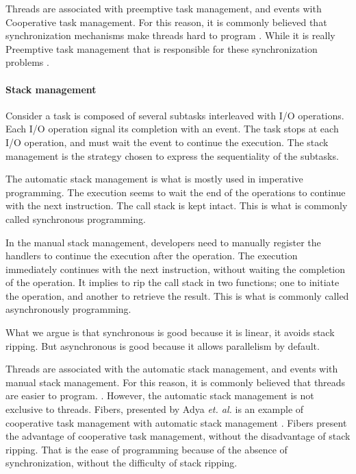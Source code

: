 Threads are associated with preemptive task management, and events with Cooperative task management.
For this reason, it is commonly believed that synchronization mechanisms make threads hard to program \cite{Ousterhout1996}.
While it is really Preemptive task management that is responsible for these synchronization problems \cite{Adya2002}.

\paragraph{Stack management}

Consider a task is composed of several subtasks interleaved with I/O operations.
Each I/O operation signal its completion with an event.
The task stops at each I/O operation, and must wait the event to continue the execution.
The stack management is the strategy chosen to express the sequentiality of the subtasks.

The automatic stack management is what is mostly used in imperative programming.
The execution seems to wait the end of the operations to continue with the next instruction.
The call stack is kept intact.
This is what is commonly called synchronous programming.

In the manual stack management, developers need to manually register the handlers to continue the execution after the operation.
The execution immediately continues with the next instruction, without waiting the completion of the operation.
It implies to rip the call stack in two functions; one to initiate the operation, and another to retrieve the result.
This is what is commonly called asynchronously programming.


What we argue is that synchronous is good because it is linear, it avoids stack ripping.
But asynchronous is good because it allows parallelism by default.




Threads are associated with the automatic stack management, and events with manual stack management.
For this reason, it is commonly believed that threads are easier to program.
\cite{Thread systems allow programmers to express control flow and encapsulate state in a more natural manner} \cite{Behren2003}.
However, the automatic stack management is not exclusive to threads.
Fibers, presented by Adya \textit{et. al.} is an example of cooperative task management with automatic stack management \cite{Adya2002} .
Fibers present the advantage of cooperative task management, without the disadvantage of stack ripping.
That is the ease of programming because of the absence of synchronization, without the difficulty of stack ripping.

